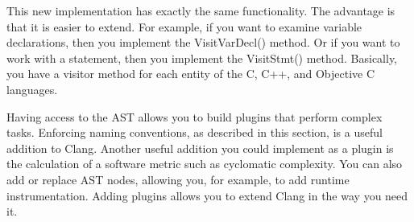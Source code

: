 This new implementation has exactly the same functionality. The advantage is that it is easier to extend. For example, if you want to examine variable declarations, then you implement the VisitVarDecl() method. Or if you want to work with a statement, then you implement the VisitStmt() method. Basically, you have a visitor method for each entity of the C, C++, and Objective C languages.\par

Having access to the AST allows you to build plugins that perform complex tasks. Enforcing naming conventions, as described in this section, is a useful addition to Clang. Another useful addition you could implement as a plugin is the calculation of a software metric such as cyclomatic complexity. You can also add or replace AST nodes, allowing you, for example, to add runtime instrumentation. Adding plugins allows you to extend Clang in the way you need it.\par









